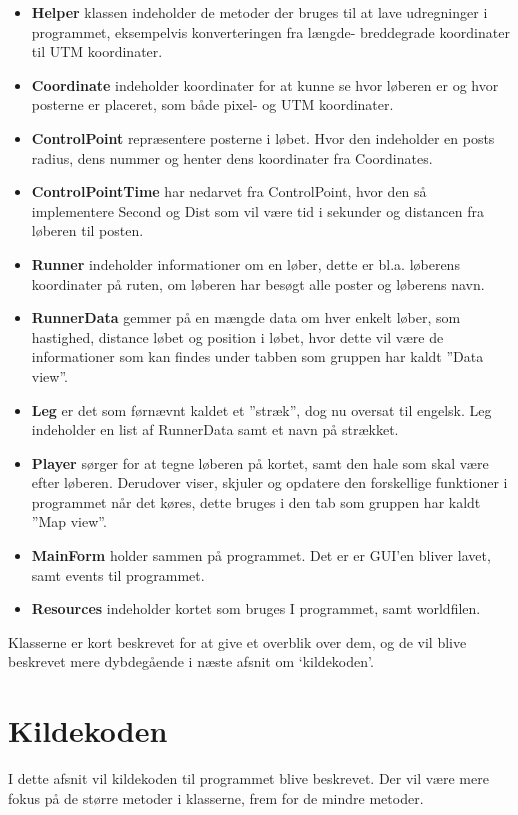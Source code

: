 \begin {itemize}
\item \textbf{Helper} klassen indeholder de metoder der bruges til at lave udregninger i programmet, eksempelvis konverteringen fra længde- breddegrade koordinater til UTM koordinater. 
\item \textbf{Coordinate} indeholder koordinater for at kunne se hvor løberen er og hvor posterne er placeret, som både pixel- og UTM koordinater. 
\item \textbf{ControlPoint} repræsentere posterne i løbet. Hvor den indeholder en posts radius, dens nummer og henter dens koordinater fra Coordinates.
\item \textbf{ControlPointTime} har nedarvet fra ControlPoint, hvor den så implementere Second og Dist som vil være tid i sekunder og distancen fra løberen til posten. 
\item \textbf{Runner} indeholder informationer om en løber, dette er bl.a. løberens koordinater på ruten, om løberen har besøgt alle poster og løberens navn.
\item \textbf{RunnerData} gemmer på en mængde data om hver enkelt løber, som hastighed, distance løbet og position i løbet, hvor dette vil være de informationer som kan findes under tabben som gruppen har kaldt ”Data view”. 
\item \textbf{Leg} er det som førnævnt kaldet et ”stræk”, dog nu oversat til engelsk. Leg indeholder en list af RunnerData samt et navn på strækket.
\item \textbf{Player} sørger for at tegne løberen på kortet, samt den hale som skal være efter løberen. Derudover viser, skjuler og opdatere den forskellige funktioner i programmet når det køres, dette bruges i den tab som gruppen har kaldt ”Map view”.
\item \textbf{MainForm} holder sammen på programmet. Det er er GUI’en bliver lavet, samt events til programmet. 
\item \textbf{Resources} indeholder kortet som bruges I programmet, samt worldfilen.
\end {itemize}

Klasserne er kort beskrevet for at give et overblik over dem, og de vil blive beskrevet mere dybdegående i næste afsnit om ‘kildekoden’.

\section{Kildekoden}
I dette afsnit vil kildekoden til programmet blive beskrevet. Der vil være mere fokus på de større metoder i klasserne, frem for de mindre metoder.

